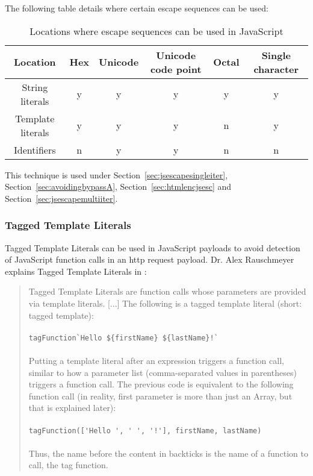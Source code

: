 The following table details where certain escape sequences can be used:

\begin{table}[h!]
	\centering
	\begin{tabular}{|c||c| c| c| c|c|}
		\hline
		Location          & Hex & Unicode & Unicode code point & Octal & Single character \\
		\hline\hline
		String literals   & y   & y       & y                  & y     & y                \\
		Template literals & y   & y       & y                  & n     & y                \\
		Identifiers       & n   & y       & y                  & n     & n                \\
		\hline
	\end{tabular}
	\caption{Locations where escape sequences can be used in JavaScript}
\end{table}
\cite{exploringes6/escapeseq,bynens/escape,js/lexicalgrammar}

This technique is used under Section~\ref{sec:jsescapesingleiter}, Section~\ref{sec:avoidingbypassA}, Section~\ref{sec:htmlencjsesc} and Section~\ref{sec:jsescapemultiiter}.


\subsubsection{Tagged Template Literals}
\label{sec:taggedtemplateliterals}
Tagged Template Literals can be used in JavaScript payloads to avoid detection of JavaScript function calls in an \acrshort{http} request payload. Dr. Alex Rauschmeyer explains Tagged Template Literals in :
\begin{quotation} Tagged Template Literals are function calls whose parameters are provided via template literals. [...]
	The following is a tagged template literal (short: tagged template): \\\\ 
	\verb|tagFunction`Hello ${firstName} ${lastName}!`| \\\\
	Putting a template literal after an expression triggers a function call, similar to how a parameter list (comma-separated values in parentheses) triggers a function call. The previous code is equivalent to the following function call (in reality, first parameter is more than just an Array, but that is explained later): \\\\
	\verb|tagFunction(['Hello ', ' ', '!'], firstName, lastName)| \\\\
	Thus, the name before the content in backticks is the name of a function to call, the tag function.
	\cite{exploringes6/templatelit}
\end{quotation}

